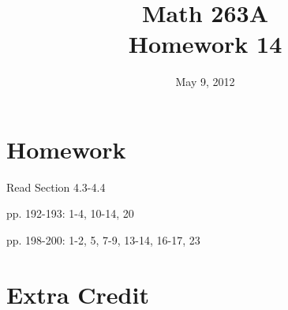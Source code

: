 \documentclass[fleqn]{exam}
\title{Math 263A \\ Homework 14}
\date{May 9, 2012}
\begin{document}
\maketitle

\section{Homework}

\begin{itemize*}
  \item Read Section 4.3-4.4
  \item pp. 192-193: 1-4, 10-14, 20
  \item pp. 198-200: 1-2, 5, 7-9, 13-14, 16-17, 23
\end{itemize*}

\section{Extra Credit}
\end{document}
